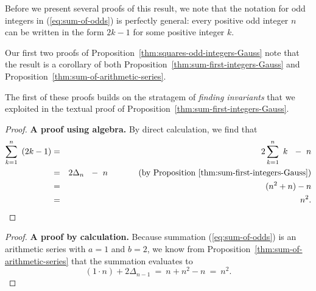 Before we present several proofs of this result, we note that the
notation for odd integers in (\ref{eq:sum-of-odds}) is perfectly
general: every positive odd integer $n$ can be written in the form
$2k-1$ for some positive integer $k$. 

\medskip

Our first two proofs of
Proposition~\ref{thm:squares-odd-integers-Gauss} note that the result
is a corollary of both Proposition~\ref{thm:sum-first-integers-Gauss}
and Proposition~\ref{thm:sum-of-arithmetic-series}.

The first of these proofs builds on the stratagem of {\em finding
  invariants} that we exploited in the textual proof of
Proposition~\ref{thm:sum-first-integers-Gauss}.

\medskip

\begin{proof}
{\bf A proof using algebra.}
%
By direct calculation, we find that
\begin{eqnarray*}
\sum_{k=1}^n \ \left( 2k-1 \right)
   & = & 2 \sum_{k=1}^n \ k \ \ - \ n \\
   & = & 2 \Delta_n \ \ - \ n \ \ \ \ \ \ \ \ \ \ \mbox{ (by
  Proposition~\ref{thm:sum-first-integers-Gauss})} \\
   & = & (n^2 + n) - n \\
   & = & n^2.
\end{eqnarray*}
\end{proof}

\medskip

\begin{proof}
{\bf A proof by calculation.}
%
Because summation (\ref{eq:sum-of-odds}) is an arithmetic series with
$a=1$ and $b=2$, we know from
Proposition~\ref{thm:sum-of-arithmetic-series} that the summation
evaluates to
\[ (1 \cdot n) + 2 \Delta_{n-1} \ = \ n + n^2 -n \ = \ n^2. \]
\end{proof}


\medskip

